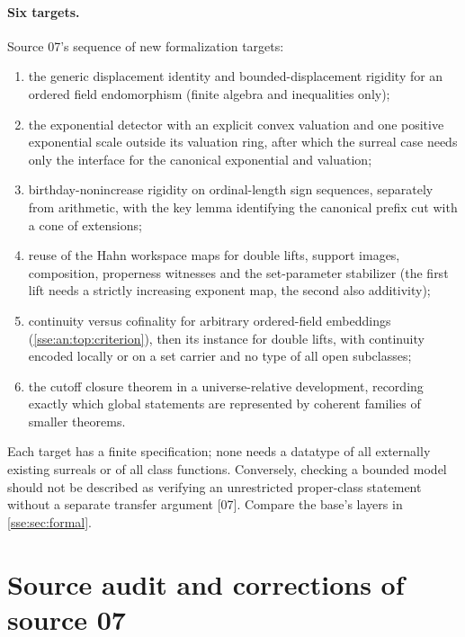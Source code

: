 \documentclass[11pt,a4paper]{article}
\numberwithin{equation}{section}
\theoremstyle{plain}
\theoremstyle{definition}
\theoremstyle{remark}
\newcommand{\src}[1]{\textup{\textsf{\small[#1]}}}%
\begin{document}
\paragraph{Six targets.} Source 07's sequence of new formalization targets:
\begin{enumerate}
\item the generic displacement identity and bounded-displacement rigidity for
an ordered field endomorphism (finite algebra and inequalities only);
\item the exponential detector with an explicit convex valuation and one
positive exponential scale outside its valuation ring, after which the
surreal case needs only the interface for the canonical exponential and
valuation;
\item birthday-nonincrease rigidity on ordinal-length sign sequences,
separately from arithmetic, with the key lemma identifying the canonical
prefix cut with a cone of extensions;
\item reuse of the Hahn workspace maps for double lifts, support images,
composition, properness witnesses and the set-parameter stabilizer (the
first lift needs a strictly increasing exponent map, the second also
additivity);
\item continuity versus cofinality for arbitrary ordered-field embeddings
(\cref{sse:an:top:criterion}), then its instance for double lifts, with
continuity encoded locally or on a set carrier and no type of all open
subclasses;
\item the cutoff closure theorem in a universe-relative development, recording
exactly which global statements are represented by coherent families of
smaller theorems.
\end{enumerate}
Each target has a finite specification; none needs a datatype of all
externally existing surreals or of all class functions. Conversely, checking
a bounded model should not be described as verifying an unrestricted
proper-class statement without a separate transfer argument \src{07}.
Compare the base's layers in \cref{sse:sec:formal}.

\section{Source audit and corrections of source 07}\label{sse:an:sec:audit}
\end{document}
